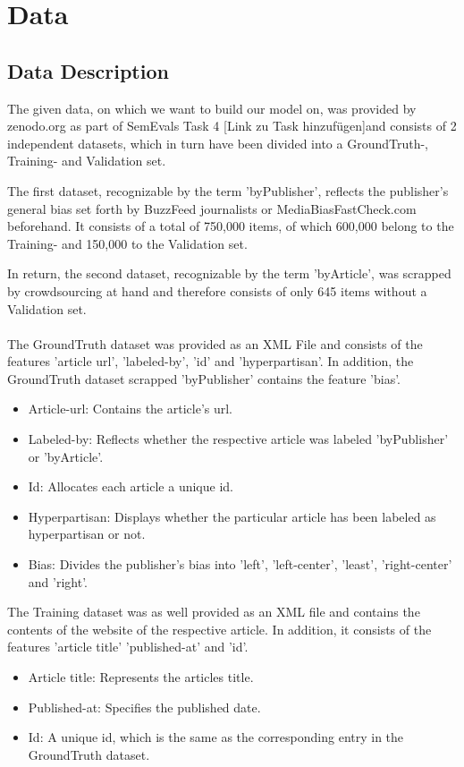 \documentclass[a4paper, 11pt,titlepage,oneside,openany]{book}
\begin{document}
\chapter{Data}
\label{cha:theory}


\section{Data Description}
 The given data, on which we want to build our model on, was provided by zenodo.org as part of SemEvals Task 4 [Link zu Task hinzufügen]and consists of 2 independent datasets, which in turn have been divided into a GroundTruth-, Training- and Validation set.
 
 \noindent The first dataset, recognizable by the term 'byPublisher', reflects the publisher's general bias set forth by BuzzFeed journalists or MediaBiasFastCheck.com beforehand. It consists of a total of 750,000 items, of which 600,000 belong to the Training- and 150,000 to the Validation set.
 
 \noindent In return, the second dataset, recognizable by the term 'byArticle', was scrapped by crowdsourcing at hand and therefore consists of only 645 items without a Validation set.\\
 \\
 The GroundTruth dataset was provided as an XML File and consists of the features 'article url', 'labeled-by', 'id' and 'hyperpartisan'. In addition, the GroundTruth dataset scrapped 'byPublisher' contains the feature 'bias'.
\begin{itemize}
	\item Article-url: Contains the article's url.
	\item Labeled-by: Reflects whether the respective article was labeled 'byPublisher' or 'byArticle'.
	\item Id: Allocates each article a unique id.
	\item Hyperpartisan: Displays whether the particular article has been labeled as hyperpartisan or not.
	\item Bias: Divides the publisher's bias into 'left', 'left-center', 'least', 'right-center' and 'right'.
\end{itemize}
 The Training dataset was as well provided as an XML file and contains the contents of the website of the respective article. In addition, it consists of the features 'article title' 'published-at' and 'id'.
\begin{itemize}
	\item Article title: Represents the articles title.
	\item Published-at: Specifies the published date.
	\item Id: A unique id, which is the same as the corresponding entry in the GroundTruth dataset.
\end{itemize}
\end{document}

